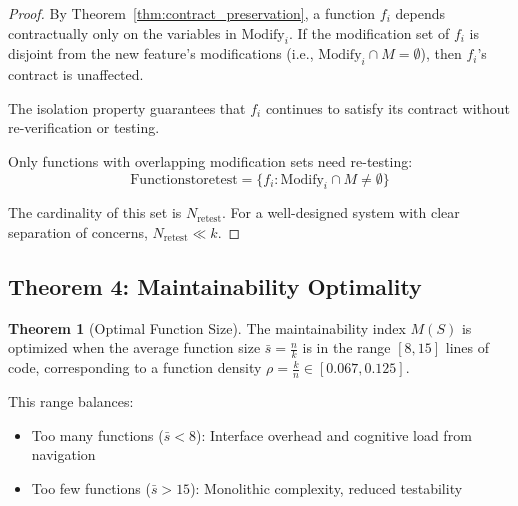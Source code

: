 \documentclass[a4paper,12pt]{article}
\theoremstyle{definition}
\newtheorem{theorem}{Theorem}
\begin{document}
\begin{proof}
By Theorem~\ref{thm:contract_preservation}, a function $f_i$ depends contractually only on the variables in $\mathrm{Modify}_i$. If the modification set of $f_i$ is disjoint from the new feature's modifications (i.e., $\mathrm{Modify}_i \cap M = \emptyset$), then $f_i$'s contract is unaffected.

The isolation property guarantees that $f_i$ continues to satisfy its contract without re-verification or testing.

Only functions with overlapping modification sets need re-testing:
\[
\mathrm{Functions to retest} = \{f_i : \mathrm{Modify}_i \cap M \neq \emptyset\}
\]

The cardinality of this set is $N_{\text{retest}}$. For a well-designed system with clear separation of concerns, $N_{\text{retest}} \ll k$. \qedhere
\end{proof}

\subsection{Theorem 4: Maintainability Optimality}

\begin{theorem}[Optimal Function Size]
\label{thm:optimal_size}
The maintainability index $M(S)$ is optimized when the average function size $\bar{s} = \frac{n}{k}$ is in the range $[8, 15]$ lines of code, corresponding to a function density $\rho = \frac{k}{n} \in [0.067, 0.125]$.

This range balances:
\begin{itemize}
	\item Too many functions ($\bar{s} < 8$): Interface overhead and cognitive load from navigation
	\item Too few functions ($\bar{s} > 15$): Monolithic complexity, reduced testability
\end{itemize}
\end{theorem}
\end{document}
